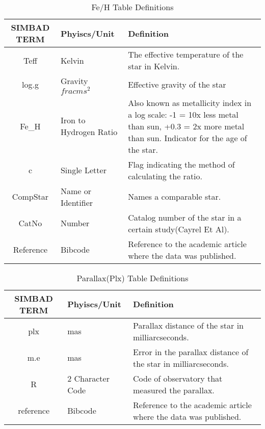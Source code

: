 \documentclass[12pt,oneside,a4paper,english]{article}
\begin{document}
\begin{table}[H]
    \centering
    \caption{Fe/H Table Definitions}
    \begin{tabular}{|c|p{3cm}|p{9cm}|}
    \centering
    \textbf{SIMBAD TERM} & \textbf{Phyiscs/Unit} & \textbf{Definition} \\ \hline \hline
    Teff & Kelvin & The effective temperature of the star in Kelvin.  \\ \hline
    log.g & Gravity $frac{m}{s^2}$ & Effective gravity of the star \\ \hline
    Fe\_H & Iron to Hydrogen Ratio & Also known as metallicity index in a log scale: -1 = 10x less metal than sun, +0.3 = 2x more metal than sun. Indicator for the age of the star.  \\ \hline
    c & Single Letter & Flag indicating the method of calculating the ratio. \\ \hline
    CompStar & Name or Identifier & Names a comparable star. \\ \hline
    CatNo & Number & Catalog number of the star in a certain study(Cayrel Et Al).  \\ \hline
    Reference & Bibcode & Reference to the academic article where the data was published.  \\ \hline
    \end{tabular}
    \label{tab:table4}
    \end{table}
    \begin{table}[H]
        \centering
        \caption{Parallax(Plx) Table Definitions}
        \begin{tabular}{|c|p{3cm}|p{9cm}|}
        \centering
        \textbf{SIMBAD TERM} & \textbf{Phyiscs/Unit} & \textbf{Definition} \\ \hline \hline
        plx & mas & Parallax distance of the star in milliarcseconds.  \\ \hline
        m.e & mas & Error in the parallax distance of the star in milliarcseconds.  \\ \hline
        R & 2 Character Code & Code of observatory that measured the parallax.  \\ \hline
        reference & Bibcode & Reference to the academic article where the data was published.  \\ \hline
        \end{tabular}
        \label{tab:table5}
    \end{table}
\end{document}
